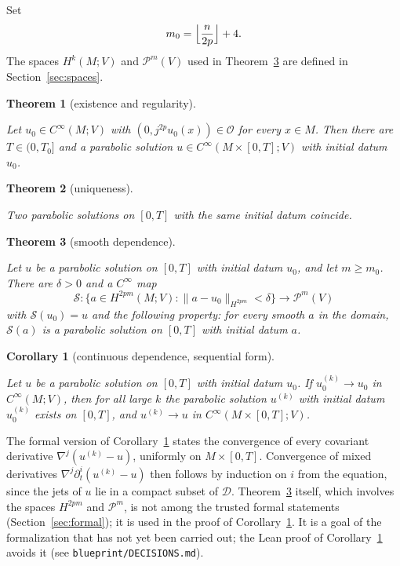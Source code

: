 \documentclass[11pt,reqno]{amsart}
\newtheorem{corollary}[theorem]{Corollary}
\newtheorem{mainthm}{Theorem}
\theoremstyle{definition}
\theoremstyle{remark}
\newcommand{\Pp}{\mathcal{P}}
\newcommand{\Par}{\mathcal{O}}
\newcommand{\norm}[1]{\lVert #1\rVert}
\newcommand{\lean}[1]{}
\newcommand{\uses}[1]{}
\numberwithin{equation}{section}
\begin{document}
Set
\[
  m_0=\Bigl\lfloor\frac{n}{2p}\Bigr\rfloor+4 .
\]
The spaces $H^{k}(M;V)$ and $\Pp^m(V)$ used in Theorem~\ref{thm:C} are defined in
Section~\ref{sec:spaces}.

\begin{mainthm}[existence and regularity]\label{thm:A}
\lean{ShortTime.exists_solution}
\uses{def:solution, def:legendre}
Let $u_0\in C^\infty(M;V)$ with $(0,j^{2p}u_0(x))\in\Par$ for every $x\in M$. Then there are
$T\in(0,T_0]$ and a parabolic solution $u\in C^\infty(M\times[0,T];V)$ with initial datum $u_0$.
\end{mainthm}

\begin{mainthm}[uniqueness]\label{thm:B}
\lean{ShortTime.solution_unique, ShortTime.EquationData.solution_unique_cov}
\uses{def:solution, def:legendre}
Two parabolic solutions on $[0,T]$ with the same initial datum coincide.
\end{mainthm}

\begin{mainthm}[smooth dependence]\label{thm:C}
\lean{ShortTime.solution_smooth_dependence}
\uses{def:solution, def:legendre, def:sobolev, def:parabolic}
Let $u$ be a parabolic solution on $[0,T]$ with initial datum $u_0$, and let $m\ge m_0$. There are
$\delta>0$ and a $C^\infty$ map
\[
  \mathcal S\colon\{a\in H^{2pm}(M;V):\norm{a-u_0}_{H^{2pm}}<\delta\}\to\Pp^m(V)
\]
with $\mathcal S(u_0)=u$ and the following property: for every smooth $a$ in the domain,
$\mathcal S(a)$ is a parabolic solution on $[0,T]$ with initial datum $a$.
\end{mainthm}

\begin{corollary}[continuous dependence, sequential form]\label{cor:C}
\lean{ShortTime.solution_continuous_dependence, ShortTime.solution_continuous_dependence', ShortTime.solution_continuous_dependence_of_covariant, ShortTime.EquationData.continuous_dependence_cov, ShortTime.EquationData.traceRegularity, ShortTime.EquationData.smoothRep_time_trace}
\uses{def:solution, def:legendre}
Let $u$ be a parabolic solution on $[0,T]$ with initial datum $u_0$. If $u_0^{(k)}\to u_0$ in
$C^\infty(M;V)$, then for all large $k$ the parabolic solution $u^{(k)}$ with initial datum
$u_0^{(k)}$ exists on $[0,T]$, and $u^{(k)}\to u$ in $C^\infty(M\times[0,T];V)$.
\end{corollary}

The formal version of Corollary~\ref{cor:C} states the convergence of every covariant derivative
$\nabla^j(u^{(k)}-u)$, uniformly on $M\times[0,T]$. Convergence of mixed derivatives
$\nabla^j\partial_t^i(u^{(k)}-u)$ then follows by induction on $i$ from the equation, since the jets
of $u$ lie in a compact subset of $\mathcal D$. Theorem~\ref{thm:C} itself, which involves the
spaces $H^{2pm}$ and $\Pp^m$, is not among the trusted formal statements
(Section~\ref{sec:formal}); it is used in the proof of Corollary~\ref{cor:C}.
It is a goal of the formalization that has not yet been carried out; the Lean proof of
Corollary~\ref{cor:C} avoids it (see \texttt{blueprint/DECISIONS.md}).
\end{document}
